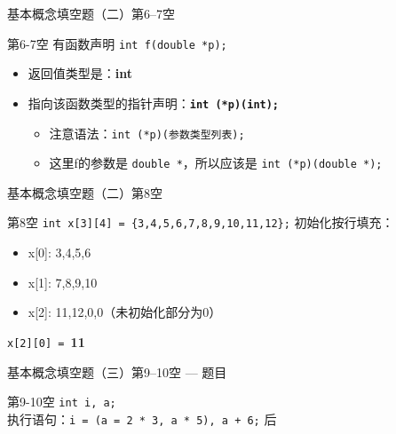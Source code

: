 \begin{frame}{基本概念填空题（二）}{第6--7空}
    \begin{exampleblock}{第6-7空}
        \small 有函数声明 \texttt{int f(double *p);}
        \begin{itemize}
            \setlength{\itemsep}{0pt}
            \item 返回值类型是：\textbf{int}
            \item 指向该函数类型的指针声明：\texttt{\textbf{int (*p)(int);}}
            \begin{itemize}
                \setlength{\itemsep}{0pt}
                \item 注意语法：\texttt{int (*p)(参数类型列表);}
                \item 这里f的参数是 \texttt{double *}，所以应该是 \texttt{int (*p)(double *);}
            \end{itemize}
        \end{itemize}
    \end{exampleblock}
\end{frame}

\begin{frame}{基本概念填空题（二）}{第8空}
    \begin{exampleblock}{第8空}
        \small \texttt{int x[3][4] = \{3,4,5,6,7,8,9,10,11,12\};}
        初始化按行填充：
        \begin{itemize}
            \setlength{\itemsep}{0pt}
            \item x[0]: {3,4,5,6}
            \item x[1]: {7,8,9,10}
            \item x[2]: {11,12,0,0}（未初始化部分为0）
        \end{itemize}
        \texttt{x[2][0] = }\textbf{11}
    \end{exampleblock}
\end{frame}

\begin{frame}{基本概念填空题（三）}{第9--10空 --- 题目}
    \begin{exampleblock}{第9-10空}
        \small \texttt{int i, a;} \\
        执行语句：\texttt{i = (a = 2 * 3, a * 5), a + 6;} 后
    \end{exampleblock}
\end{frame}

